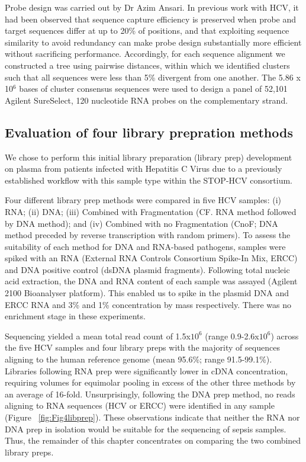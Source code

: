 Probe design was carried out by Dr Azim Ansari. In previous work with HCV, it had been observed that sequence capture efficiency is preserved when probe and target sequences differ at up to 20\% of positions, and that exploiting sequence similarity to avoid redundancy can make probe design substantially more efficient without sacrificing performance. Accordingly, for each sequence alignment we constructed a tree using pairwise distances, within which we identified clusters such that all sequences were less than 5\% divergent from one another. The 5.86 x 10$^6$ bases of cluster consensus sequences were used to design a panel of 52,101 Agilent SureSelect, 120 nucleotide RNA probes on the complementary strand.


\subsection{Evaluation of four library prepration methods} \label{ssec:lib_preps}
We chose to perform this initial library preparation (library prep) development on plasma from patients infected with Hepatitis C Virus due to a previously established workflow with this sample type within the STOP-HCV consortium.

Four different library prep methods were compared in five HCV samples: (i) RNA; (ii) DNA; (iii) Combined with Fragmentation (CF. RNA method followed by DNA method); and (iv) Combined with no Fragmentation (CnoF; DNA method preceded by reverse transcription with random primers). To assess the suitability of each method for DNA and RNA-based pathogens, samples were spiked with an RNA (External RNA Controls Consortium Spike-In Mix, ERCC) and DNA positive control (dsDNA plasmid fragments). Following total nucleic acid extraction, the DNA and RNA content of each sample was assayed (Agilent 2100 Bioanalyser platform). This enabled us to spike in the plasmid DNA and ERCC RNA and 3\% and 1\% concentration by mass respectively. There was no enrichment stage in these experiments.

Sequencing yielded a mean total read count of 1.5x$10^6$ (range 0.9-2.6x$10^6$) across the five HCV samples and four library preps with the majority of sequences aligning to the human reference genome (mean 95.6\%; range 91.5-99.1\%). Libraries following RNA prep were significantly lower in cDNA concentration, requiring volumes for equimolar pooling in excess of the other three methods by an average of 16-fold. Unsurprisingly, following the DNA prep method, no reads aligning to RNA sequences (HCV or ERCC) were identified in any sample (Figure ~\ref{fig:Fig4libprep}). These observations indicate that neither the RNA nor DNA prep in isolation would be suitable for the sequencing of sepsis samples. Thus, the remainder of this chapter concentrates on comparing the two combined library preps.

